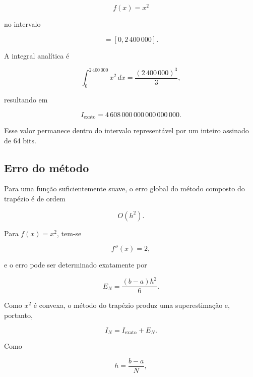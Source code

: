 \begin{equation}
    f(x)=x^2
\end{equation}

no intervalo

\begin{equation}
    [a,b]=[0,2\,400\,000].
\end{equation}

A integral analítica é

\begin{equation}
    \int_0^{2\,400\,000}x^2\,dx
    =
    \frac{(2\,400\,000)^3}{3},
\end{equation}

resultando em

\begin{equation}
    I_{\text{exato}}
    =
    4\,608\,000\,000\,000\,000\,000.
    \label{eq:atvd04-integral-exata}
\end{equation}

Esse valor permanece dentro do intervalo representável por um inteiro
assinado de 64 bits.

\subsection{Erro do método}

Para uma função suficientemente suave, o erro global do método composto do
trapézio é de ordem

\begin{equation}
    O(h^2).
\end{equation}

Para \(f(x)=x^2\), tem-se

\begin{equation}
    f''(x)=2,
\end{equation}

e o erro pode ser determinado exatamente por

\begin{equation}
    E_N =
    \frac{(b-a)h^2}{6}.
    \label{eq:atvd04-erro}
\end{equation}

Como \(x^2\) é convexa, o método do trapézio produz uma superestimação e,
portanto,

\begin{equation}
    I_N =
    I_{\text{exato}} + E_N.
    \label{eq:atvd04-resultado-esperado}
\end{equation}

Como

\begin{equation}
    h=\frac{b-a}{N},
\end{equation}

